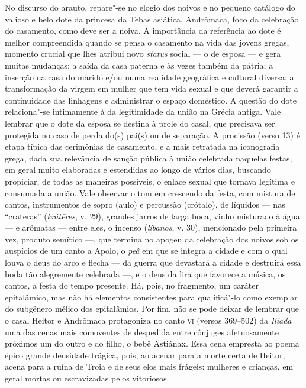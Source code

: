 {{No discurso do arauto, repare"-se no
elogio dos noivos e no pequeno catálogo do valioso e belo dote da princesa da
Tebas asiática, Andrômaca, foco da celebração do casamento, como deve ser a noiva.
A importância da
referência ao dote é melhor
compreendida quando se pensa o casamento na vida das jovens gregas, momento
crucial que lhes atribui novo \textit{status} social --- o de esposa --- e gera
muitas mudanças: a saída da casa paterna e às vezes também da pátria; a
inserção na casa do marido e/ou numa realidade geográfica e cultural diversa; a
transformação da virgem em mulher que tem vida sexual e que deverá garantir a
continuidade das linhagens e administrar o espaço doméstico. A questão do dote
relaciona"-se intimamente à da legitimidade da união na Grécia antiga. Vale
lembrar que o dote da esposa se destina à prole do casal, que precisava ser
protegida no caso de perda do(s) pai(s) ou de separação. A procissão (verso
13) é etapa típica das cerimônias de casamento, e a mais retratada na iconografia grega, dada sua relevância de sanção pública à união celebrada naquelas festas, em geral muito elaboradas e
estendidas ao longo de vários dias, buscando propiciar, de todas as maneiras
possíveis, o enlace sexual que tornava legítima e consumada a união.
Vale observar o tom em crescendo da festa, com mistura de cantos, instrumentos de sopro (aulo) e percussão (crótalo), de líquidos --- nas ``crateras'' (\textit{krátēres}, v. 29), grandes jarros de larga boca, vinho misturado à água --- e arômatas  --- entre eles, o incenso (\textit{líbanos}, v. 30), mencionado pela primeira vez, produto semítico ---, que termina no apogeu da celebração dos noivos sob os auspícios de um canto a Apolo, o \textit{peâ} em que se integra a cidade e com o qual louva o deus do arco e flecha --- da guerra que devastará a cidade e destruirá essa boda tão alegremente celebrada ---, e o deus da lira que favorece a música, os cantos, a festa do tempo presente. 
Há, pois, no fragmento, um caráter epitalâmico, mas não há elementos consistentes para
qualificá"-lo como exemplar do subgênero mélico dos epitalâmios. Por fim, não se
pode deixar de lembrar que o casal Heitor e Andrômaca protagoniza no canto \textsc{vi}
(versos 369--502) da \textit{Ilíada} uma das cenas mais comoventes de despedida
entre cônjuges afetuosamente próximos um do outro e do filho, o bebê Astiánax.
Essa cena empresta ao poema épico grande densidade trágica, pois, ao acenar
para a morte certa de Heitor, acena para a ruína de Troia e de seus elos mais
frágeis: mulheres e crianças, em geral mortas ou escravizadas pelos vitoriosos.
}}

